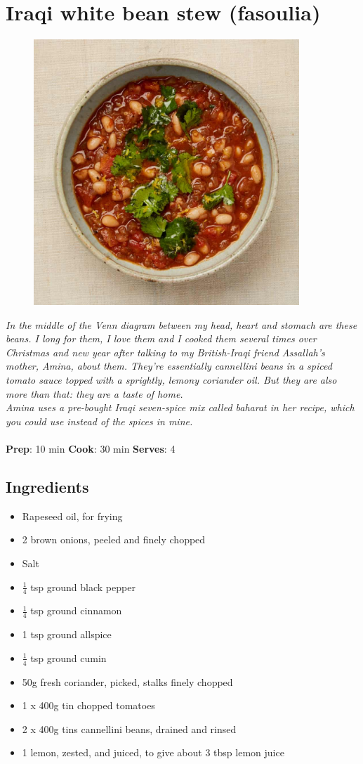 \documentclass{book}
\begin{document}
\section{Iraqi white bean stew (fasoulia)}
\begin{figure}
\centering\includegraphics[width=10cm,height=10cm,keepaspectratio]{Recipe_Pictures/Iraqi_white_bean_stew_(fasoulia).png}
\end{figure}
\emph{In the middle of the Venn diagram between my head, heart and stomach are these beans. I long for them, I love them and I cooked them several times over Christmas and new year after talking to my British-Iraqi friend Assallah’s mother, Amina, about them. They’re essentially cannellini beans in a spiced tomato sauce topped with a sprightly, lemony coriander oil. But they are also more than that: they are a taste of home.\\ 
Amina uses a pre-bought Iraqi seven-spice mix called baharat in her recipe, which you could use instead of the spices in mine.}\\\\ 
\textbf{Prep}: 10 min
\textbf{Cook}: 30 min
\textbf{Serves}: 4
\subsection*{Ingredients}
\begin{itemize}
\item Rapeseed oil, for frying
\item 2 brown onions, peeled and finely chopped
\item Salt
\item $\frac{1}{4}$ tsp ground black pepper 
\item $\frac{1}{4}$ tsp ground cinnamon 
\item 1 tsp ground allspice
\item $\frac{1}{4}$ tsp ground cumin
\item 50g fresh coriander, picked, stalks finely chopped
\item 1 x 400g tin chopped tomatoes
\item 2 x 400g tins cannellini beans, drained and rinsed
\item 1 lemon, zested, and juiced, to give about 3 tbsp lemon juice
\end{itemize}
\end{document}
